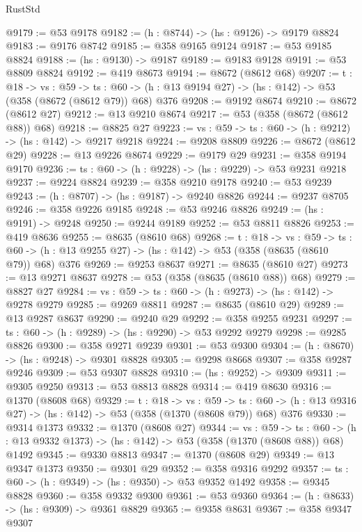 \begin{lexlean}{RustStd}
\begin{coremodule}
@9179 := @53 @9178
@9182 := (h : @8744) -> (hs : @9126) -> @9179 @8824
@9183 := @9176 @8742
@9185 := @358 @9165 @9124
@9187 := @53 @9185 @8824
@9188 := (hs : @9130) -> @9187
@9189 := @9183 @9128
@9191 := @53 @8809 @8824
@9192 := @419 @8673
@9194 := @8672 (@8612 @68)
@9207 := {t : @18} ->
  {vs : @59} ->
  {ts : @60} -> (h : @13 @9194 @27) -> (hs : @142) -> @53 (@358 (@8672 (@8612 @79)) @68) @376
@9208 := @9192 @8674
@9210 := @8672 (@8612 @27)
@9212 := @13 @9210 @8674
@9217 := @53 (@358 (@8672 (@8612 @88)) @68)
@9218 := @8825 @27
@9223 := {vs : @59} -> {ts : @60} -> (h : @9212) -> (hs : @142) -> @9217 @9218
@9224 := @9208 @8809
@9226 := @8672 (@8612 @29)
@9228 := @13 @9226 @8674
@9229 := @9179 @29
@9231 := @358 @9194 @9170
@9236 := {ts : @60} -> (h : @9228) -> (hs : @9229) -> @53 @9231 @9218
@9237 := @9224 @8824
@9239 := @358 @9210 @9178
@9240 := @53 @9239
@9243 := (h : @8707) -> (hs : @9187) -> @9240 @8826
@9244 := @9237 @8705
@9246 := @358 @9226 @9185
@9248 := @53 @9246 @8826
@9249 := (hs : @9191) -> @9248
@9250 := @9244 @9189
@9252 := @53 @8811 @8826
@9253 := @419 @8636
@9255 := @8635 (@8610 @68)
@9268 := {t : @18} ->
  {vs : @59} ->
  {ts : @60} -> (h : @13 @9255 @27) -> (hs : @142) -> @53 (@358 (@8635 (@8610 @79)) @68) @376
@9269 := @9253 @8637
@9271 := @8635 (@8610 @27)
@9273 := @13 @9271 @8637
@9278 := @53 (@358 (@8635 (@8610 @88)) @68)
@9279 := @8827 @27
@9284 := {vs : @59} -> {ts : @60} -> (h : @9273) -> (hs : @142) -> @9278 @9279
@9285 := @9269 @8811
@9287 := @8635 (@8610 @29)
@9289 := @13 @9287 @8637
@9290 := @9240 @29
@9292 := @358 @9255 @9231
@9297 := {ts : @60} -> (h : @9289) -> (hs : @9290) -> @53 @9292 @9279
@9298 := @9285 @8826
@9300 := @358 @9271 @9239
@9301 := @53 @9300
@9304 := (h : @8670) -> (hs : @9248) -> @9301 @8828
@9305 := @9298 @8668
@9307 := @358 @9287 @9246
@9309 := @53 @9307 @8828
@9310 := (hs : @9252) -> @9309
@9311 := @9305 @9250
@9313 := @53 @8813 @8828
@9314 := @419 @8630
@9316 := @1370 (@8608 @68)
@9329 := {t : @18} ->
  {vs : @59} ->
  {ts : @60} -> (h : @13 @9316 @27) -> (hs : @142) -> @53 (@358 (@1370 (@8608 @79)) @68) @376
@9330 := @9314 @1373
@9332 := @1370 (@8608 @27)
@9344 := {vs : @59} ->
  {ts : @60} -> (h : @13 @9332 @1373) -> (hs : @142) -> @53 (@358 (@1370 (@8608 @88)) @68) @1492
@9345 := @9330 @8813
@9347 := @1370 (@8608 @29)
@9349 := @13 @9347 @1373
@9350 := @9301 @29
@9352 := @358 @9316 @9292
@9357 := {ts : @60} -> (h : @9349) -> (hs : @9350) -> @53 @9352 @1492
@9358 := @9345 @8828
@9360 := @358 @9332 @9300
@9361 := @53 @9360
@9364 := (h : @8633) -> (hs : @9309) -> @9361 @8829
@9365 := @9358 @8631
@9367 := @358 @9347 @9307

\end{coremodule}
\end{lexlean}

